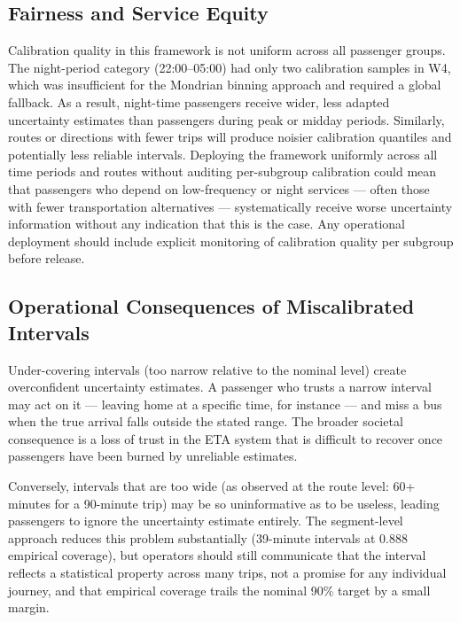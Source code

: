 \documentclass[12pt, a4paper, oneside]{report}
\begin{document}
\subsection{Fairness and Service Equity}

Calibration quality in this framework is not uniform across all passenger groups. The night-period category (22:00--05:00) had only two calibration samples in W4, which was insufficient for the Mondrian binning approach and required a global fallback. As a result, night-time passengers receive wider, less adapted uncertainty estimates than passengers during peak or midday periods. Similarly, routes or directions with fewer trips will produce noisier calibration quantiles and potentially less reliable intervals. Deploying the framework uniformly across all time periods and routes without auditing per-subgroup calibration could mean that passengers who depend on low-frequency or night services --- often those with fewer transportation alternatives --- systematically receive worse uncertainty information without any indication that this is the case. Any operational deployment should include explicit monitoring of calibration quality per subgroup before release.

\subsection{Operational Consequences of Miscalibrated Intervals}

Under-covering intervals (too narrow relative to the nominal level) create overconfident uncertainty estimates. A passenger who trusts a narrow interval may act on it --- leaving home at a specific time, for instance --- and miss a bus when the true arrival falls outside the stated range. The broader societal consequence is a loss of trust in the ETA system that is difficult to recover once passengers have been burned by unreliable estimates.

Conversely, intervals that are too wide (as observed at the route level: 60+ minutes for a 90-minute trip) may be so uninformative as to be useless, leading passengers to ignore the uncertainty estimate entirely. The segment-level approach reduces this problem substantially (39-minute intervals at 0.888 empirical coverage), but operators should still communicate that the interval reflects a statistical property across many trips, not a promise for any individual journey, and that empirical coverage trails the nominal 90\% target by a small margin.
\end{document}
